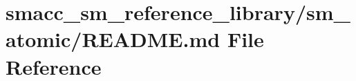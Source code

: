 \hypertarget{smacc__sm__reference__library_2sm__atomic_2README_8md}{}\section{smacc\+\_\+sm\+\_\+reference\+\_\+library/sm\+\_\+atomic/\+R\+E\+A\+D\+ME.md File Reference}
\label{smacc__sm__reference__library_2sm__atomic_2README_8md}
